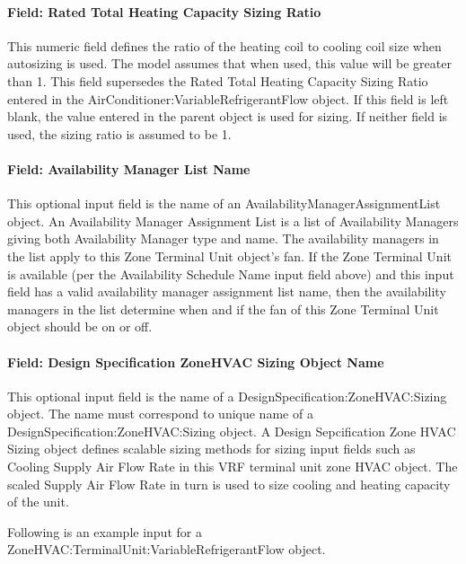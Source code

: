 \paragraph{Field: Rated Total Heating Capacity Sizing Ratio}\label{field-rated-total-heating-capacity-sizing-ratio-000}

This numeric field defines the ratio of the heating coil to cooling coil size when autosizing is used. The model assumes that when used, this value will be greater than 1. This field supersedes the Rated Total Heating Capacity Sizing Ratio entered in the AirConditioner:VariableRefrigerantFlow object. If this field is left blank, the value entered in the parent object is used for sizing. If neither field is used, the sizing ratio is assumed to be 1.

\paragraph{Field: Availability Manager List Name}\label{field-availability-manager-list-name-10}

This optional input field is the name of an AvailabilityManagerAssignmentList object. An Availability Manager Assignment List is a list of Availability Managers giving both Availability Manager type and name. The availability managers in the list apply to this Zone Terminal Unit object's fan. If the Zone Terminal Unit is available (per the Availability Schedule Name input field above) and this input field has a valid availability manager assignment list name, then the availability managers in the list determine when and if the fan of this Zone Terminal Unit object should be on or off.

\paragraph{Field: Design Specification ZoneHVAC Sizing Object Name}\label{field-design-specification-zonehvac-sizing-object-name-9}

This optional input field is the name of a DesignSpecification:ZoneHVAC:Sizing object. The name must correspond to unique name of a DesignSpecification:ZoneHVAC:Sizing object. A Design Sepcification Zone HVAC Sizing object defines scalable sizing methods for sizing input fields such as Cooling Supply Air Flow Rate in this VRF terminal unit zone HVAC object. The scaled Supply Air Flow Rate in turn is used to size cooling and heating capacity of the unit.

Following is an example input for a ZoneHVAC:TerminalUnit:VariableRefrigerantFlow object.


